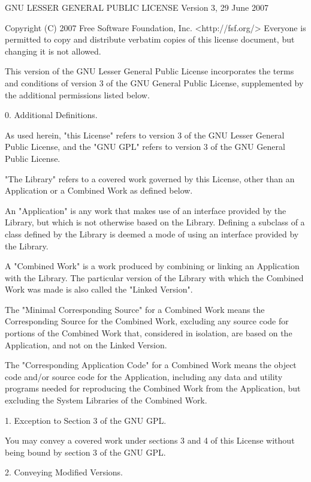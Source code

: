 \begin{DoxyVerbInclude}
                   GNU LESSER GENERAL PUBLIC LICENSE
                       Version 3, 29 June 2007

 Copyright (C) 2007 Free Software Foundation, Inc. <http://fsf.org/>
 Everyone is permitted to copy and distribute verbatim copies
 of this license document, but changing it is not allowed.


  This version of the GNU Lesser General Public License incorporates
the terms and conditions of version 3 of the GNU General Public
License, supplemented by the additional permissions listed below.

  0. Additional Definitions.

  As used herein, "this License" refers to version 3 of the GNU Lesser
General Public License, and the "GNU GPL" refers to version 3 of the GNU
General Public License.

  "The Library" refers to a covered work governed by this License,
other than an Application or a Combined Work as defined below.

  An "Application" is any work that makes use of an interface provided
by the Library, but which is not otherwise based on the Library.
Defining a subclass of a class defined by the Library is deemed a mode
of using an interface provided by the Library.

  A "Combined Work" is a work produced by combining or linking an
Application with the Library.  The particular version of the Library
with which the Combined Work was made is also called the "Linked
Version".

  The "Minimal Corresponding Source" for a Combined Work means the
Corresponding Source for the Combined Work, excluding any source code
for portions of the Combined Work that, considered in isolation, are
based on the Application, and not on the Linked Version.

  The "Corresponding Application Code" for a Combined Work means the
object code and/or source code for the Application, including any data
and utility programs needed for reproducing the Combined Work from the
Application, but excluding the System Libraries of the Combined Work.

  1. Exception to Section 3 of the GNU GPL.

  You may convey a covered work under sections 3 and 4 of this License
without being bound by section 3 of the GNU GPL.

  2. Conveying Modified Versions.


\end{DoxyVerbInclude}
